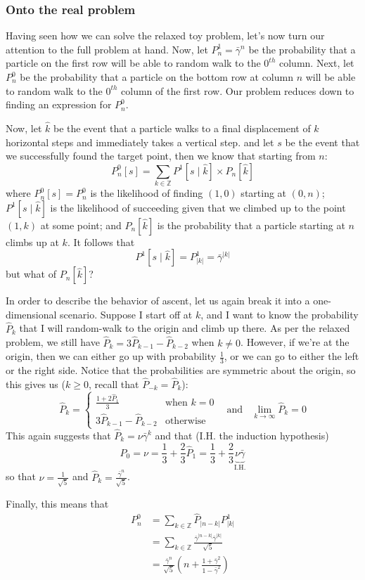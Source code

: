 \subsubsection{Onto the real problem}

Having seen how we can solve the relaxed toy problem, let's now turn our attention to the full problem at hand. Now, let $P^{1}_n = \bar\gamma^n$ be the probability that a particle on the first row will be able to random walk to the $0^{th}$ column. Next, let $P^{0}_n$ be the probability that a particle on the bottom row at column $n$ will be able to random walk to the $0^{th}$ column of the first row. Our problem reduces down to finding an expression for $P^0_n$.

Now, let $\hat k$ be the event that a particle walks to a final displacement of $k$ horizontal steps and immediately takes a vertical step. and let $s$ be the event that we successfully found the target point, then we know that starting from $n$:
$$
P^0_n[s] = \sum_{k \in \mathbb{Z}} P^1[s \mid \hat k] \times P_n[\hat k]
$$
where $P^0_n[s] = P^0_n$ is the likelihood of finding $(1,0)$ starting at $(0,n)$; $P^1[s \mid \hat k]$ is the likelihood of succeeding given that we climbed up to the point $(1,k)$ at some point; and $P_n[\hat k]$ is the probability that a particle starting at $n$ climbs up at $k$. It follows that
$$
P^1[s \mid \hat k] = P^1_{|k|} = \bar\gamma^{|k|}
$$
but what of $P_n[\hat k]$?

In order to describe the behavior of ascent, let us again break it into a one-dimensional scenario. Suppose I start off at $k$, and I want to know the probability $\hat P_k$ that I will random-walk to the origin and climb up there. As per the relaxed problem, we still have $\hat P_k = 3 \hat P_{k-1} - \hat P_{k-2}$ when $k \ne 0$. However, if we're at the origin, then we can either go up with probability $\frac13$, or we can go to either the left or the right side. Notice that the probabilities are symmetric about the origin, so this gives us ($k \ge 0$, recall that $\hat P_{-k} = \hat P_k$):
$$
\hat P_k = \begin{cases}
\frac{1 + 2\hat P_1}{3} & \text{when }k = 0 \\
3 \hat P_{k-1} - \hat P_{k-2} & \text{otherwise}
\end{cases} ~~~~ \text{and} ~~~~ \lim_{k\to\infty} \hat P_k = 0
$$
This again suggests that $\hat P_k = \nu \bar\gamma^k$ and that (I.H. the induction hypothesis)
$$
P_0 = \nu = \frac13 + \frac23\hat P_1 = \frac13 + \frac23\underbrace{\nu \bar\gamma}_{\text{I.H.}}
$$
so that $\nu = \frac1{\sqrt{5}}$ and $\hat P_k = \frac{\bar\gamma^n}{\sqrt{5}}$.

Finally, this means that
\begin{align*}
P^0_n &= \sum_{k\in\mathbb{Z}} \hat P_{|n-k|} P^1_{|k|} \\
&=\sum_{k\in\mathbb{Z}} \frac{\bar\gamma^{|n-k|}\bar\gamma^{|k|}}{\sqrt{5}} \\
&= \boxed{\frac{\bar\gamma^n}{\sqrt{5}}\left(n + \frac{1 + \bar\gamma^2}{1 - \bar\gamma^2}\right)}
\end{align*}